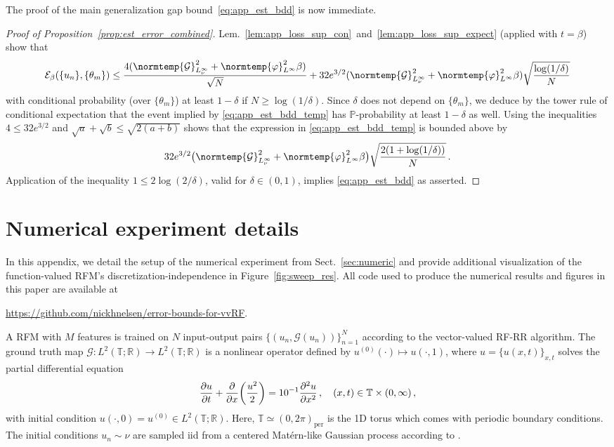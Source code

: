 \documentclass{article}
\theoremstyle{plain}
\theoremstyle{my_def}
\theoremstyle{my_rem}
\numberwithin{equation}{section}
\numberwithin{theorem}{section}%
\newcommand{\T}{\mathbb{T}}
\newcommand{\R}{\mathbb{R}}
\renewcommand{\P}{\mathbb{P}}
\newcommand{\cE}{\mathcal{E}}
\newcommand{\cG}{\mathcal{G}}
\let\originalleft\left %
\let\originalright\right
\renewcommand{\left}{\mathopen{}\mathclose\bgroup\originalleft}
\renewcommand{\right}{\aftergroup\egroup\originalright}
\newcommand{\norm}{\normtemp}
\newcommand{\U}{{\{u_n\}}}
\newcommand{\Th}{{\{\theta_m\}}}
\renewcommand{\phi}{\varphi}
\begin{document}
The proof of the main generalization gap bound~\eqref{eq:app_est_bdd} is now immediate.
\begin{proof}[Proof of Proposition~\ref{prop:est_error_combined}]    Lem.~\ref{lem:app_loss_sup_con}~and~\ref{lem:app_loss_sup_expect} (applied with $t=\beta$) show that
    \begin{equation}\label{eq:app_est_bdd_temp}
    \cE_\beta(\U,\Th)\leq \frac{4(\norm{\cG}_{L_\nu^\infty}^2 + \norm{\phi}_{L^\infty}^2 \beta)}{\sqrt{N}}
    + 32e^{3/2}(\norm{\cG}_{L_\nu^\infty}^2 + \norm{\phi}_{L^\infty}^2 \beta)\sqrt{\frac{\log(1/\delta)}{N}}
    \end{equation}
    with conditional probability (over $\Th$) at least $1-\delta$ if $N\geq \log(1/\delta)$. Since $\delta$ does not depend on $\Th$, we deduce by the tower rule of conditional expectation that the event implied by \eqref{eq:app_est_bdd_temp} has $\P$-probability at least $1-\delta$ as well. Using the inequalities $4\leq 32e^{3/2}$ and $\sqrt{a}+\sqrt{b}\leq \sqrt{2(a+b)}$
    shows that the expression in \eqref{eq:app_est_bdd_temp} is bounded above by
    \begin{equation*}
          32e^{3/2}\bigl(\norm{\cG}_{L_\nu^\infty}^2 + \norm{\phi}_{L^\infty}^2 \beta\bigr)\sqrt{\frac{2(1+\log(1/\delta))}{N}}\,.
    \end{equation*}
    Application of the inequality $1\leq 2\log(2/\delta)$, valid for $\delta\in(0,1)$, implies \eqref{eq:app_est_bdd} as asserted.
\end{proof}

\section{Numerical experiment details}\label{app:numeric}
In this appendix, we detail the setup of the numerical experiment from Sect.~\ref{sec:numeric} and provide additional visualization of the function-valued RFM's discretization-independence in Figure~\ref{fig:sweep_res}.
All code used to produce the numerical results and figures in this paper are available at
\begin{center}
    \url{https://github.com/nickhnelsen/error-bounds-for-vvRF}.
\end{center}

A RFM with $M$ features is trained on $N$ input-output pairs $\{(u_n, \mathcal{G}(u_n))\}_{n=1}^N$ according to the vector-valued RF-RR algorithm. The ground truth map $\mathcal{G}\colon L^2(\mathbb{T};\mathbb{R})\to L^2(\mathbb{T};\mathbb{R}) $ is a nonlinear operator defined by $u^{(0)}(\cdot)\mapsto u(\cdot, 1)$, where $u=\{u(x,t)\}_{x,t}$ solves the partial differential equation
 \begin{align*}
        \frac{\partial u}{\partial t} + \frac{\partial}{\partial x}\left(\frac{u^2}{2}\right)=10^{-1}\frac{\partial^2 u}{\partial x^2}\,, \quad (x,t)\in \mathbb{T}\times (0,\infty)\,,
\end{align*}
with initial condition $u(\cdot,0) = u^{(0)}\in L^2(\T;\R)$. Here, $\mathbb{T}\simeq (0,2\pi)_{\mathrm{per}}$ is the 1D torus which comes with periodic boundary conditions.
The initial conditions $u_n\sim\nu$ are sampled iid from a centered Mat\'ern-like Gaussian process according to \cite[Sect. 6.3, p. 32]{kovachki2023neural}.
\end{document}

